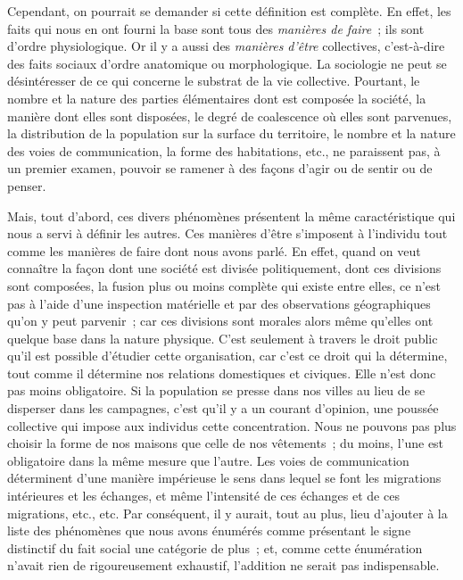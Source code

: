 \documentclass[french,twoside]{book} %
\begin{document}
Cependant, on pourrait se demander si cette définition est complète. En effet, les faits qui nous en ont fourni la base sont tous des {\itshape manières de faire} ; ils sont d’ordre physiologique. Or il y a aussi des {\itshape manières d’être} collectives, c’est-à-dire des faits sociaux d’ordre anatomique ou morphologique. La sociologie ne peut se désintéresser de ce qui concerne le substrat de la vie collective. Pourtant, le nombre et la nature des parties élémentaires dont est composée la société, la manière dont elles sont disposées, le degré de coalescence où elles sont parvenues, la distribution de la population sur la surface du territoire, le nombre et la nature des voies de communication, la forme des habitations, etc., ne paraissent pas, à un premier examen, pouvoir se ramener à des façons d’agir ou de sentir ou de penser.\par
Mais, tout d’abord, ces divers phénomènes présentent la même caractéristique qui nous a servi à définir les autres. Ces manières d’être s’imposent à l’individu tout comme les manières de faire dont nous avons parlé. En effet, quand on veut connaître la façon dont une société est divisée politiquement, dont ces divisions sont composées, la fusion plus ou moins complète qui existe entre elles, ce n’est pas à l’aide d’une inspection matérielle et par des observations géographiques qu’on y peut parvenir ; car ces divisions sont morales alors même qu’elles ont quelque base dans la nature physique. C’est seulement à travers le droit public qu’il est possible d’étudier cette organisation, car c’est ce droit qui la détermine, tout comme il détermine nos relations domestiques et civiques. Elle n’est donc pas moins obligatoire. Si la population se presse dans nos villes au lieu de se disperser dans les campagnes, c’est qu’il y a un courant d’opinion, une poussée collective qui impose aux individus cette concentration. Nous ne pouvons pas plus choisir la forme de nos maisons que celle de nos vêtements ; du moins, l’une est obligatoire dans la même mesure que l’autre. Les voies de communication déterminent d’une manière impérieuse le sens dans lequel se font les migrations intérieures et les échanges, et même l’intensité de ces échanges et de ces migrations, etc., etc. Par conséquent, il y aurait, tout au plus, lieu d’ajouter à la liste des phénomènes que nous avons énumérés comme présentant le signe distinctif du fait social une catégorie de plus ; et, comme cette énumération n’avait rien de rigoureusement exhaustif, l’addition ne serait pas indispensable.\par
\end{document}
